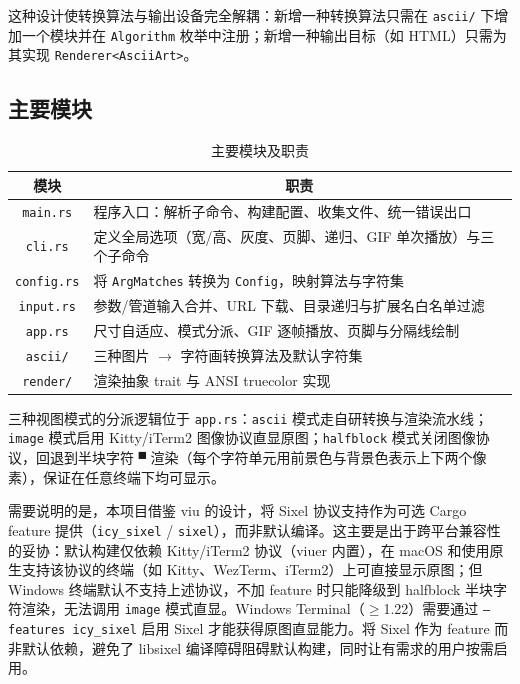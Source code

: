 \documentclass{SYSUReport}
\begin{document}
这种设计使转换算法与输出设备完全解耦：新增一种转换算法只需在 \texttt{ascii/} 下增加一个模块并在 \texttt{Algorithm} 枚举中注册；新增一种输出目标（如 HTML）只需为其实现 \texttt{Renderer<AsciiArt>}。

\subsection{主要模块}

\begin{table}[!htbp]
    \centering
    \caption{主要模块及职责}
    \label{tab:modules}
    \begin{tabular}{cl}
        \toprule
        模块 & \multicolumn{1}{c}{职责} \\
        \midrule
        \texttt{main.rs}   & 程序入口：解析子命令、构建配置、收集文件、统一错误出口 \\
        \texttt{cli.rs}    & 定义全局选项（宽/高、灰度、页脚、递归、GIF 单次播放）与三个子命令 \\
        \texttt{config.rs} & 将 \texttt{ArgMatches} 转换为 \texttt{Config}，映射算法与字符集 \\
        \texttt{input.rs}  & 参数/管道输入合并、URL 下载、目录递归与扩展名白名单过滤 \\
        \texttt{app.rs}    & 尺寸自适应、模式分派、GIF 逐帧播放、页脚与分隔线绘制 \\
        \texttt{ascii/}    & 三种图片 $\rightarrow$ 字符画转换算法及默认字符集 \\
        \texttt{render/}   & 渲染抽象 trait 与 ANSI truecolor 实现 \\
        \bottomrule
    \end{tabular}
\end{table}

三种视图模式的分派逻辑位于 \texttt{app.rs}：\texttt{ascii} 模式走自研转换与渲染流水线；\texttt{image} 模式启用 Kitty/iTerm2 图像协议直显原图；\texttt{halfblock} 模式关闭图像协议，回退到半块字符 \verb|▀| 渲染（每个字符单元用前景色与背景色表示上下两个像素），保证在任意终端下均可显示。

需要说明的是，本项目借鉴 viu 的设计，将 Sixel 协议支持作为可选 Cargo feature 提供（\texttt{icy\_sixel} / \texttt{sixel}），而非默认编译。这主要是出于跨平台兼容性的妥协：默认构建仅依赖 Kitty/iTerm2 协议（viuer 内置），在 macOS 和使用原生支持该协议的终端（如 Kitty、WezTerm、iTerm2）上可直接显示原图；但 Windows 终端默认不支持上述协议，不加 feature 时只能降级到 halfblock 半块字符渲染，无法调用 \texttt{image} 模式直显。Windows Terminal（$\ge$1.22）需要通过 \texttt{---features icy\_sixel} 启用 Sixel 才能获得原图直显能力。将 Sixel 作为 feature 而非默认依赖，避免了 libsixel 编译障碍阻碍默认构建，同时让有需求的用户按需启用。
\end{document}
